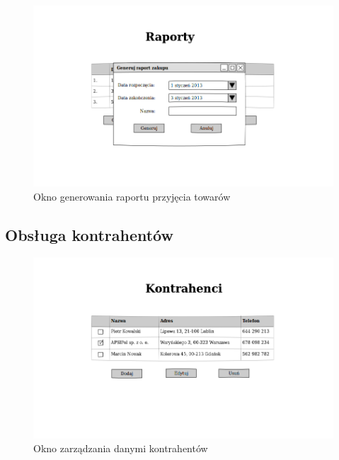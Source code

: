 \begin{figure}[!htb]
  \begin{center}
    \includegraphics[scale=0.45]{../img/interfejs/generowanie-raportu-zakupow.png}
  \end{center}
  \caption{Okno generowania raportu przyjęcia towarów}
\end{figure}
\FloatBarrier

\subsection{Obsługa kontrahentów}

\begin{figure}[!htb]
  \begin{center}
    \includegraphics[scale=0.45]{../img/interfejs/zarzadzanie-kontrahentami.png}
  \end{center}
  \caption{Okno zarządzania danymi kontrahentów}
\end{figure}
\FloatBarrier

